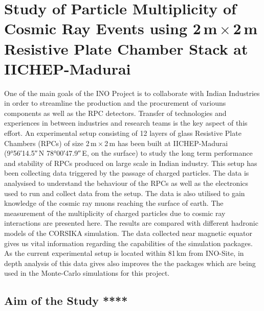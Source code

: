 \chapter{Study of Particle Multiplicity of Cosmic Ray Events using
  2\,m\,$\times$\,2\,m Resistive Plate Chamber Stack at IICHEP-Madurai}

One of the main goals of the INO Project is to collaborate with Indian
Industries in order to streamline the production and the procurement
of variouns components as well as the RPC detectors. Transfer of
technologies and experiences in between industries and research teams
is the key aspect of this effort.
An experimental setup consisting of 12 layers of glass Resistive Plate
Chambers (RPCs) of size 2\,m\,$\times$\,2\,m has been built at
IICHEP-Madurai (\ang{9;56;14.5}\,N \ang{78;00;47.9}\,E, on the surface)
to study the long term performance and stability of RPCs produced on
large scale in Indian industry. This setup has been collecting data
triggered by the passage of charged particles. The data is analysised
to understand the behaviour of the RPCs as well as the electronics
used to run and collect data from the setup. The data is also utilised
to gain knowledge of the cosmic ray muons reaching the surface of
earth. The measurement of the multiplicity of charged particles due to
cosmic ray interactions are presented here. The results are compared
with different hadronic models of the CORSIKA simulation. The data
collected near magnetic equator gives us vital information regarding
the capabilities of the simulation packages. As the current
experimental setup is located within 81\,km from INO-Site, in depth
analysis of this data gives also improves the the packages which are
being used in the Monte-Carlo simulations for this project.

\section{Aim of the Study ****}

